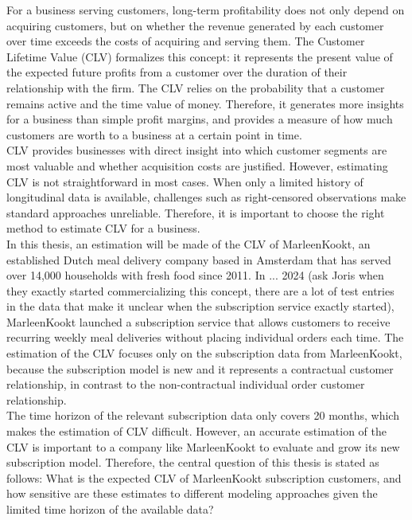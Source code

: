 For a business serving customers, long-term profitability does not only depend on acquiring customers, but on whether the revenue generated by each customer over time exceeds the costs of acquiring and serving them. The Customer Lifetime Value (CLV) formalizes this concept: it represents the present value of the expected future profits from a customer over the duration of their relationship with the firm. The CLV relies on the probability that a customer remains active and the time value of money. Therefore, it generates more insights for a business than simple profit margins, and provides a measure of how much customers are worth to a business at a certain point in time. \\

CLV provides businesses with direct insight into which customer segments are most valuable and whether acquisition costs are justified. However, estimating CLV is not straightforward in most cases. When only a limited history of longitudinal data is available, challenges such as right-censored observations make standard approaches unreliable. Therefore, it is important to choose the right method to estimate CLV for a business. \\

In this thesis, an estimation will be made of the CLV of MarleenKookt, an established Dutch meal delivery company based in Amsterdam that has served over 14,000 households with fresh food since 2011. In ... 2024 (ask Joris when they exactly started commercializing this concept, there are a lot of test entries in the data that make it unclear when the subscription service exactly started), MarleenKookt launched a subscription service that allows customers to receive recurring weekly meal deliveries without placing individual orders each time. The estimation of the CLV focuses only on the subscription data from MarleenKookt, because the subscription model is new and it represents a contractual customer relationship, in contrast to the non-contractual individual order customer relationship. \\

The time horizon of the relevant subscription data only covers 20 months, which makes the estimation of CLV difficult. However, an accurate estimation of the CLV is important to a company like MarleenKookt to evaluate and grow its new subscription model. Therefore, the central question of this thesis is stated as follows: What is the expected CLV of MarleenKookt subscription customers, and how sensitive are these estimates to different modeling approaches given the limited time horizon of the available data?


